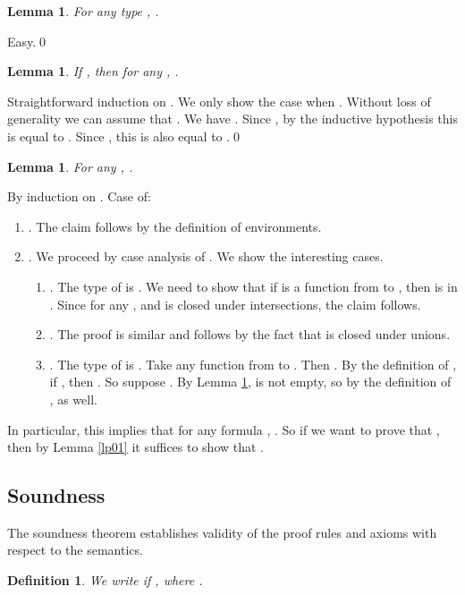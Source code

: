 \documentclass{LMCS}
\newtheorem{definition}[thm]{Definition}
\newtheorem{lemma}[thm]{Lemma}
\begin{document}
\begin{lemma}\label{typesnotempty}
For any type , .
\end{lemma}
\proof
Easy.\qed

\begin{lemma}\label{fvfv}
If , then for any , .
\end{lemma}
\proof
Straightforward induction on . We only show the case when . Without loss of generality we can assume that . 
We have . Since
, by the inductive hypothesis this is equal to
. Since , this is also equal to .\qed


\begin{lemma}\label{lin}
For any , . 
\end{lemma}
By induction on . Case  of:
\begin{enumerate}[]
\item . The claim follows by the definition of environments. 
\item . We proceed by case analysis of . We show the interesting
cases. 
\begin{enumerate}[]
\item . The type of  is .
We need to show that if  is a function from  to ,
then  is in . Since for any ,  and  is closed under intersections,
the claim follows.
\item . The proof is similar and follows by the fact that  is closed
under unions.
\item . The type of  is . Take any function  from  to . Then . By the definition of , if , then . So suppose 
. By Lemma \ref{typesnotempty},  is
not empty, so by the definition of ,  as well. 
\end{enumerate}
\end{enumerate}

In particular, this implies that for any formula , . 
So if we want to prove that , then by Lemma \ref{lp01} it
suffices to show that .

\subsection{Soundness}

The soundness theorem establishes validity of the proof rules and axioms with respect to the semantics.

\begin{definition}
We write  if ,  where .
\end{definition}
\end{document}
